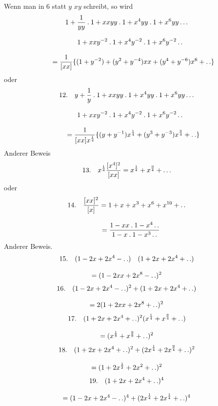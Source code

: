 Wenn man in 6 statt $y$ $xy$ schreibt, so wird
\[
\begin{gathered}
1+\frac{1}{yy}\mathbin{.}1+xxyy\mathbin{.}1+x^4yy\mathbin{.}1+x^6yy\mathinner{.\,.\,.}
\\[8pt]\quad{}1+xxy^{-2}\mathbin{.}1+x^4y^{-2}\mathbin{.}1+x^6y^{-2}\mathinner{.\,.}\\[8pt]
\qquad=\frac{1}{[xx]}\{(1+y^{-2})+(y^2+y^{-4})xx+(y^4+y^{-6})x^6+\mathinner{.\,.}\}
\end{gathered}
\]
oder
\[
\begin{gathered}
12.\quad{}y+\frac{1}{y}\mathbin{.}1+xxyy\mathbin{.}1+x^4yy\mathbin{.}1+x^6yy\mathinner{.\,.\,.}
\\[8pt]\quad{}1+xxy^{-2}\mathbin{.}1+x^4y^{-2}\mathbin{.}1+x^6y^{-2}\mathinner{.\,.}\\[8pt]
\qquad=\frac{1}{[xx]x^{\frac14}}\{(y+y^{-1})x^{\frac14}+(y^3+y^{-3})x^{\frac94}+\mathinner{.\,.}\}
\end{gathered}
\]
Anderer Beweis
\[
13.\quad x^{\frac14}\frac{[x^4]^2}{[xx]}=x^{\frac14}+x^{\frac94}+\mathinner{.\,.\,.}
\]
oder
\[
\begin{gathered}14.\quad\frac{[xx]^2}{[x]}=1+x+x^3+x^6+x^{10}+\mathinner{.\,.}
\\[8pt]\quad{}=\frac{1-xx\mathbin{.}1-x^4\mathinner{.\,.}}{1-x\mathbin{.}1-x^3\mathinner{.\,.}}\end{gathered}
\]
Anderer Beweis.
\[
\begin{gathered}15.\quad(1-2x+2x^4-\mathinner{.\,.})\quad(1+2x+2x^4+\mathinner{.\,.})
\\[8pt]=(1-2xx+2x^8-\mathinner{.\,.})^2\end{gathered}
\]
\[
\begin{gathered}16.\quad(1-2x+2x^4-\mathinner{.\,.})^2+(1+2x+2x^4+\mathinner{.\,.})
\\[8pt]=2(1+2xx+2x^8+\mathinner{.\,.})^2\end{gathered}
\]
\[
\begin{gathered}17.\quad(1+2x+2x^4+\mathinner{.\,.})^2(x^{\frac14}+x^{\frac94}+\mathinner{.\,.})
\\[8pt]=(x^{\frac18}+x^{\frac98}+\mathinner{.\,.})^2\end{gathered}
\]
\[
\begin{gathered}18.\quad(1+2x+2x^4+\mathinner{.\,.})^2+(2x^{\frac14}+2x^{\frac94}+\mathinner{.\,.})^2
\\[8pt]=(1+2x^{\frac12}+2x^2+\mathinner{.\,.})^2\end{gathered}
\]
\[
\begin{gathered}19.\quad(1+2x+2x^4+\mathinner{.\,.})^4
\\[8pt]=(1-2x+2x^4-\mathinner{.\,.})^4+(2x^{\frac14}+2x^{\frac14}+\mathinner{.\,.})^4\end{gathered}
\]
\clearpage
\endgroup
